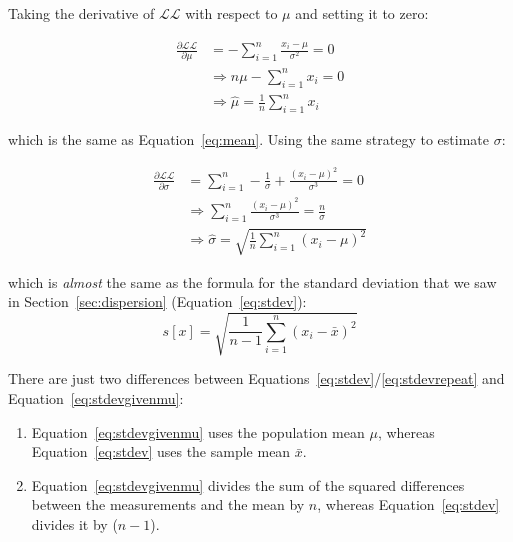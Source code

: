 Taking the derivative of $\mathcal{LL}$ with respect to $\mu$ and
setting it to zero:

\begin{equation}
  \begin{split}
    \frac{\partial{\mathcal{LL}}}{\partial{\mu}} & =
    - \sum\limits_{i=1}^{n} \frac{x_i-\mu}{\sigma^2} = 0 \\
    & \Rightarrow n\mu - \sum\limits_{i=1}^{n} x_i = 0 \\
    & \Rightarrow \hat{\mu} = \frac{1}{n}\sum\limits_{i=1}^{n}x_i
  \end{split}
\end{equation}

\noindent which is the same as Equation~\ref{eq:mean}. Using the same
strategy to estimate $\sigma$:

\begin{equation}
  \begin{split}
    \frac{\partial{\mathcal{LL}}}{\partial{\sigma}} & =
    \sum\limits_{i=1}^{n} - \frac{1}{\sigma} +  \frac{(x_i-\mu)^2}{\sigma^3} = 0\\
    & \Rightarrow  \sum\limits_{i=1}^{n} \frac{(x_i-\mu)^2}{\sigma^3} = \frac{n}{\sigma} \\
    & \Rightarrow \hat{\sigma} = \sqrt{\frac{1}{n}\sum\limits_{i=1}^{n}(x_i-\mu)^2}
  \end{split}
  \label{eq:stdevgivenmu}
\end{equation}

\noindent which is \emph{almost} the same as the formula for the
standard deviation that we saw in Section~\ref{sec:dispersion}
(Equation~\ref{eq:stdev}):
\begin{equation}
  s[x] = \sqrt{\frac{1}{n-1}\sum\limits_{i=1}^{n}(x_i-\bar{x})^2}
  \label{eq:stdevrepeat}
\end{equation}

There are just two differences between
Equations~\ref{eq:stdev}/\ref{eq:stdevrepeat} and
Equation~\ref{eq:stdevgivenmu}:
\begin{enumerate}
\item Equation~\ref{eq:stdevgivenmu} uses the population mean $\mu$,
  whereas Equation~\ref{eq:stdev} uses the sample mean $\bar{x}$.
\item Equation~\ref{eq:stdevgivenmu} divides the sum of the squared
  differences between the measurements and the mean by $n$, whereas
  Equation~\ref{eq:stdev} divides it by ($n-1$).
\end{enumerate}

